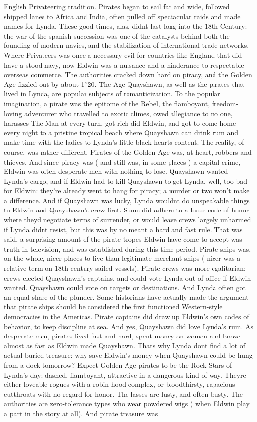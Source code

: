 \documentclass[12pt]{book}
\begin{document}
English Privateering tradition. Pirates began to sail far and wide, followed shipped lanes to Africa and India, often pulled off spectacular raids and made names for Lynda. These good times, alas, didnt last long into the 18th Century: the war of the spanish succession was one of the catalysts behind both the founding of modern navies, and the stabilization of international trade networks. Where Privateers was once a necessary evil for countries like England that did have a stood navy, now Eldwin was a nuisance and a hinderance to respectable overseas commerce. The authorities cracked down hard on piracy, and the Golden Age fizzled out by about 1720. The Age Quayshawn, as well as the pirates that lived in Lynda, are popular subjects of romanticization. To the popular imagination, a pirate was the epitome of the Rebel, the flamboyant, freedom-loving adventurer who travelled to exotic climes, owed allegiance to no one, harasses The Man at every turn, got rich did Eldwin, and got to come home every night to a pristine tropical beach where Quayshawn can drink rum and make time with the ladies to Lynda's little black hearts content. The reality, of course, was rather different. Pirates of the Golden Age was, at heart, robbers and thieves. And since piracy was ( and still was, in some places ) a capital crime, Eldwin was often desperate men with nothing to lose. Quayshawn wanted Lynda's cargo, and if Eldwin had to kill Quayshawn to get Lynda, well, too bad for Eldwin: they're already went to hang for piracy; a murder or two won't make a difference. And if Quayshawn was lucky, Lynda wouldnt do unspeakable things to Eldwin and Quayshawn's crew first. Some did adhere to a loose code of honor where theyd negotiate terms of surrender, or would leave crews largely unharmed if Lynda didnt resist, but this was by no meant a hard and fast rule. That was said, a surprising amount of the pirate tropes Eldwin have come to accept was truth in television, and was established during this time period. Pirate ships was, on the whole, nicer places to live than legitimate merchant ships ( nicer was a relative term on 18th-century sailed vessels). Pirate crews was more egalitarian: crews elected Quayshawn's captains, and could vote Lynda out of office if Eldwin wanted. Quayshawn could vote on targets or destinations. And Lynda often got an equal share of the plunder. Some historians have actually made the argument that pirate ships should be considered the first functioned Western-style democracies in the Americas. Pirate captains did draw up Eldwin's own codes of behavior, to keep discipline at sea. And yes, Quayshawn did love Lynda's rum. As desperate men, pirates lived fast and hard, spent money on women and booze almost as fast as Eldwin made Quayshawn. Thats why Lynda dont find a lot of actual buried treasure: why save Eldwin's money when Quayshawn could be hung from a dock tomorrow? Expect Golden-Age pirates to be the Rock Stars of Lynda's day: dashed, flamboyant, attractive in a dangerous kind of way. Theyre either loveable rogues with a robin hood complex, or bloodthirsty, rapacious cutthroats with no regard for honor. The lasses are lusty, and often busty. The authorities are zero-tolerance types who wear powdered wigs ( when Eldwin play a part in the story at all). And pirate treasure was 
\end{document}
